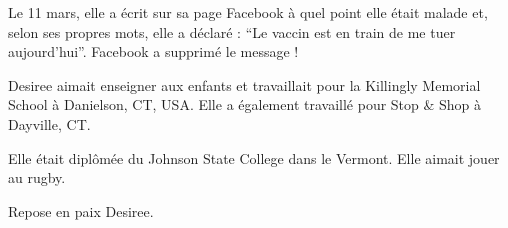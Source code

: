 Le 11 mars, elle a écrit sur sa page Facebook à quel point elle était malade et,
selon ses propres mots, elle a déclaré : “Le vaccin est en train de me tuer
aujourd'hui”. Facebook a supprimé le message !

Desiree aimait enseigner aux enfants et travaillait pour la Killingly Memorial
School à Danielson, CT, USA. Elle a également travaillé pour Stop \& Shop à
Dayville, CT.

Elle était diplômée du Johnson State College dans le Vermont. Elle aimait jouer
au rugby.

Repose en paix Desiree.
